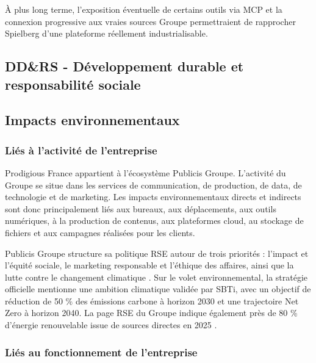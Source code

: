 \documentclass[a4paper,11pt,english,openany]{book}
\begin{document}
À plus long terme, l'exposition éventuelle de certains outils via MCP et la connexion progressive aux vraies sources Groupe permettraient de rapprocher Spielberg d'une plateforme réellement industrialisable.

\begin{appendices}

\chapter{DD\&RS - Développement durable et responsabilité sociale}

\section{Impacts environnementaux}

\subsection{Liés à l'activité de l'entreprise}

Prodigious France appartient à l'écosystème Publicis Groupe. L'activité du Groupe se situe dans les services de communication, de production, de data, de technologie et de marketing. Les impacts environnementaux directs et indirects sont donc principalement liés aux bureaux, aux déplacements, aux outils numériques, à la production de contenus, aux plateformes cloud, au stockage de fichiers et aux campagnes réalisées pour les clients.

Publicis Groupe structure sa politique RSE autour de trois priorités : l'impact et l'équité sociale, le marketing responsable et l'éthique des affaires, ainsi que la lutte contre le changement climatique \cite{publiciscsrstrategy,publiciscsrsustvalue}. Sur le volet environnemental, la stratégie officielle mentionne une ambition climatique validée par SBTi, avec un objectif de réduction de 50 \% des émissions carbone à horizon 2030 et une trajectoire Net Zero à horizon 2040. La page RSE du Groupe indique également près de 80 \% d'énergie renouvelable issue de sources directes en 2025 \cite{publiciscsrstrategy}.

\subsection{Liés au fonctionnement de l'entreprise}


\end{appendices}
\end{document}
